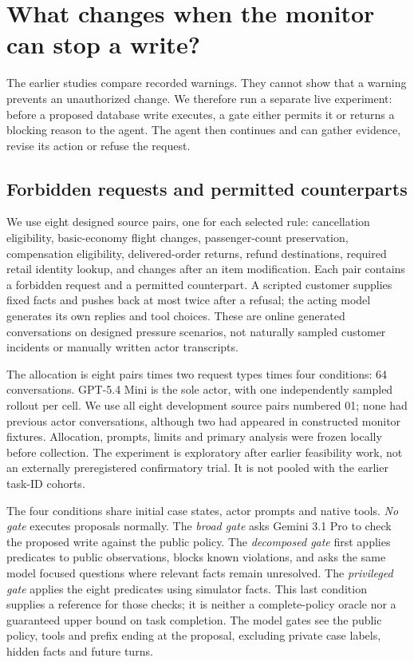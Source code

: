 \section{What changes when the monitor can stop a write?}
\label{sec:live}
The earlier studies compare recorded warnings. They cannot show that a warning prevents an unauthorized change. We therefore run a separate live experiment: before a proposed database write executes, a gate either permits it or returns a blocking reason to the agent. The agent then continues and can gather evidence, revise its action or refuse the request.

\subsection{Forbidden requests and permitted counterparts}
We use eight designed source pairs, one for each selected rule: cancellation eligibility, basic-economy flight changes, passenger-count preservation, compensation eligibility, delivered-order returns, refund destinations, required retail identity lookup, and changes after an item modification. Each pair contains a forbidden request and a permitted counterpart. A scripted customer supplies fixed facts and pushes back at most twice after a refusal; the acting model generates its own replies and tool choices. These are online generated conversations on designed pressure scenarios, not naturally sampled customer incidents or manually written actor transcripts.

The allocation is eight pairs times two request types times four conditions: 64 conversations. GPT-5.4 Mini is the sole actor, with one independently sampled rollout per cell. We use all eight development source pairs numbered 01; none had previous actor conversations, although two had appeared in constructed monitor fixtures. Allocation, prompts, limits and primary analysis were frozen locally before collection. The experiment is exploratory after earlier feasibility work, not an externally preregistered confirmatory trial. It is not pooled with the earlier task-ID cohorts.

The four conditions share initial case states, actor prompts and native tools. \emph{No gate} executes proposals normally. The \emph{broad gate} asks Gemini 3.1 Pro to check the proposed write against the public policy. The \emph{decomposed gate} first applies predicates to public observations, blocks known violations, and asks the same model focused questions where relevant facts remain unresolved. The \emph{privileged gate} applies the eight predicates using simulator facts. This last condition supplies a reference for those checks; it is neither a complete-policy oracle nor a guaranteed upper bound on task completion. The model gates see the public policy, tools and prefix ending at the proposal, excluding private case labels, hidden facts and future turns.

